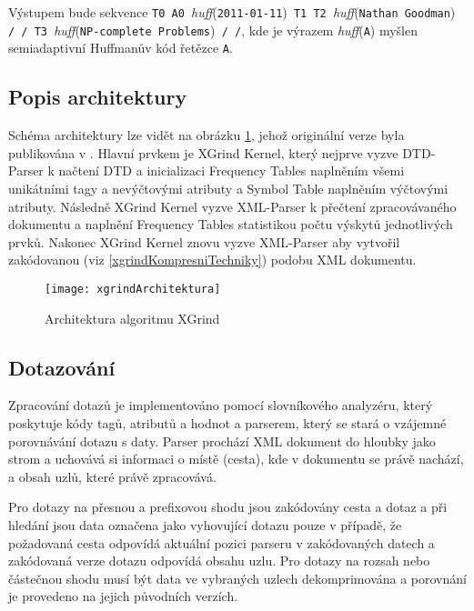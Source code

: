 Výstupem bude sekvence \texttt{T0 A0 }\textit{huff}(\texttt{2011-01-11})\texttt{ T1 T2 }\textit{huff}(\texttt{Nathan Goodman})\texttt{ / / T3 }\textit{huff}(\texttt{NP-complete Problems})\texttt{ / /}, kde je výrazem \textit{huff}(\texttt{A}) myšlen semiadaptivní Huffmanův kód řetězce \texttt{A}.

\subsection{Popis architektury}
Schéma architektury lze vidět na obrázku \ref{architekturaXGrind}, jehož originální verze byla publikována v \cite{xgrind}. Hlavní prvkem je XGrind Kernel, který nejprve vyzve DTD-Parser k načtení DTD a inicializaci Frequency Tables naplněním všemi unikátními tagy a nevýčtovými atributy a Symbol Table naplněním výčtovými atributy. Následně XGrind Kernel vyzve XML-Parser k přečtení zpracovávaného dokumentu a naplnění Frequency Tables statistikou počtu výskytů jednotlivých prvků. Nakonec XGrind Kernel znovu vyzve XML-Parser aby vytvořil zakódovanou (viz \ref{xgrindKompresniTechniky}) podobu XML dokumentu.\cite{xgrind}

\begin{figure}[!htb]
\centering
\texttt{[image: xgrindArchitektura]}
\caption{Architektura algoritmu XGrind}
\label{architekturaXGrind}
\end{figure}

\subsection{Dotazování}
Zpracování dotazů je implementováno pomocí slovníkového analyzéru, který poskytuje kódy tagů, atributů a hodnot a parserem, který se stará o vzájemné porovnávání dotazu s daty. Parser prochází XML dokument do hloubky jako strom a uchovává si informaci o místě (cesta), kde v dokumentu se právě nachází, a obsah uzlů, které právě zpracovává.

Pro dotazy na přesnou a prefixovou shodu jsou zakódovány cesta a dotaz a při hledání jsou data označena jako vyhovující dotazu pouze v případě, že požadovaná cesta odpovídá aktuální pozici parseru v zakódovaných datech a zakódovaná verze dotazu odpovídá obsahu uzlu. Pro dotazy na rozsah nebo částečnou shodu musí být data ve vybraných uzlech dekomprimována a porovnání je provedeno na jejich původních verzích.